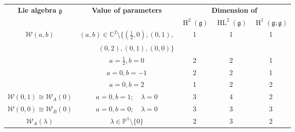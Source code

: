 \documentclass[11pt, svgnames]{amsart}
\newcommand{\g}{\ensuremath{\mathfrak{g}}}
\newcommand{\CC}{\mathbb{C}}
\newcommand{\PP}{\mathbb{P}}
\newcommand{\W}{\mathcal{W}}
\DeclareMathOperator{\HH}{H}
\DeclareMathOperator{\HL}{HL}
\newcommand{\nonzero}{\setminus \{0\}}
\theoremstyle{definition}
\begin{document}
\begin{table}[ht]
\centering
\begin{tabular}{|c|c|ccc|}
\hline
\multirow{2}{*}{\textbf{Lie algebra} $\g$}     & \multirow{2}{*}{\textbf{Value of parameters}}          & \multicolumn{3}{c|}{\textbf{Dimension of}}                                                     \\ \cline{3-5} 
                                 &                                               & \multicolumn{1}{c|}{$\HH^2(\g)$}          & \multicolumn{1}{c|}{$\HL^2(\g)$}         & $\HH^1(\g;\g)$       \\ \hline
\multirow{5}{*}{$\W(a,b)$}       & $(a,b) \in \CC^2 \setminus \{(\frac{1}{2},0), (0,1),$      & \multicolumn{1}{c|}{\multirow{2}{*}{1}} & \multicolumn{1}{c|}{\multirow{2}{*}{1}} & \multirow{2}{*}{1} \\
                                 & \multicolumn{1}{r|}{$(0,2), (0,1),(0,0)\}$}   & \multicolumn{1}{c|}{}                   & \multicolumn{1}{c|}{}                   &                    \\ \cline{2-5} 
                                 & $a = \frac{1}{2}, b = 0$                      & \multicolumn{1}{c|}{2}                  & \multicolumn{1}{c|}{2}                  & 1                  \\ \cline{2-5} 
                                 & $a = 0, b = -1$                               & \multicolumn{1}{c|}{2}                  & \multicolumn{1}{c|}{2}                  & 1                  \\ \cline{2-5} 
                                 & $a = 0, b = 2$                                & \multicolumn{1}{c|}{1}                  & \multicolumn{1}{c|}{2}                  & 2                  \\ \hline
$\W(0,1) \cong \W_A(0)$          & $a = 0, b = 1; \quad \lambda = 0$             & \multicolumn{1}{c|}{3}                  & \multicolumn{1}{c|}{4}                  & 2                  \\ \hline
$\W(0,0) \cong \W_B(0)$          & $a = 0, b = 0; \quad \lambda = 0$             & \multicolumn{1}{c|}{3}                  & \multicolumn{1}{c|}{3}                  & 3                  \\ \hline
\multirow{2}{*}{$\W_A(\lambda)$} & \multirow{2}{*}{$\lambda \in \PP^1 \nonzero$} & \multicolumn{1}{c|}{\multirow{2}{*}{2}} & \multicolumn{1}{c|}{\multirow{2}{*}{3}} & \multirow{2}{*}{2} \\
                                 &                                               & \multicolumn{1}{c|}{}                   & \multicolumn{1}{c|}{}                   &                    \\ \hline

\end{tabular}
\end{table}
\end{document}
